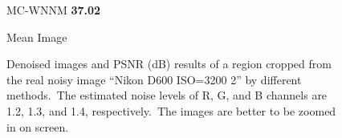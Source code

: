 \begin{figure}
{\begin{minipage}[t]{0.19\textwidth}
{\footnotesize MC-WNNM \textbf{37.02}}
\end{minipage}
\begin{minipage}[t]{0.19\textwidth}
\centering
{}
{\footnotesize Mean Image }
\end{minipage}
}
    \caption{Denoised images and PSNR (dB) results of a region cropped from the real noisy image ``Nikon D600 ISO=3200 2'' \cite{crosschannel2016} by different methods.\ The estimated noise levels of R, G, and B channels are 1.2, 1.3, and 1.4, respectively.\ The images are better to be zoomed in on screen.}
    \label{fig4-14}
\end{figure}


